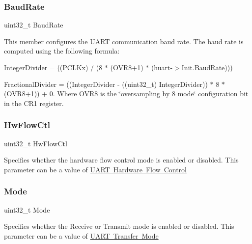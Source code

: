 \subsubsection{\texorpdfstring{Baud\+Rate}{BaudRate}}
{\footnotesize\ttfamily uint32\+\_\+t Baud\+Rate}

This member configures the U\+A\+RT communication baud rate. The baud rate is computed using the following formula\+:
\begin{DoxyItemize}
\item Integer\+Divider = ((P\+C\+L\+Kx) / (8 $\ast$ (O\+V\+R8+1) $\ast$ (huart-\/$>$Init.\+Baud\+Rate)))
\item Fractional\+Divider = ((Integer\+Divider -\/ ((uint32\+\_\+t) Integer\+Divider)) $\ast$ 8 $\ast$ (O\+V\+R8+1)) + 0. Where O\+V\+R8 is the \char`\"{}oversampling by 8 mode\char`\"{} configuration bit in the C\+R1 register. 
\end{DoxyItemize}\mbox{\label{struct_u_a_r_t___init_type_def_a0a933d213b17470c582c8fec23a24d09}} 
\subsubsection{\texorpdfstring{Hw\+Flow\+Ctl}{HwFlowCtl}}
{\footnotesize\ttfamily uint32\+\_\+t Hw\+Flow\+Ctl}

Specifies whether the hardware flow control mode is enabled or disabled. This parameter can be a value of \mbox{\hyperlink{group___u_a_r_t___hardware___flow___control}{U\+A\+RT Hardware Flow Control}} \mbox{\label{struct_u_a_r_t___init_type_def_a0ffc93ec511ed9cf1663f6939bd3e839}} 
\subsubsection{\texorpdfstring{Mode}{Mode}}
{\footnotesize\ttfamily uint32\+\_\+t Mode}

Specifies whether the Receive or Transmit mode is enabled or disabled. This parameter can be a value of \mbox{\hyperlink{group___u_a_r_t___mode}{U\+A\+RT Transfer Mode}} \mbox{\label{struct_u_a_r_t___init_type_def_a35770b237370fda7fd0fabad22898490}} 
